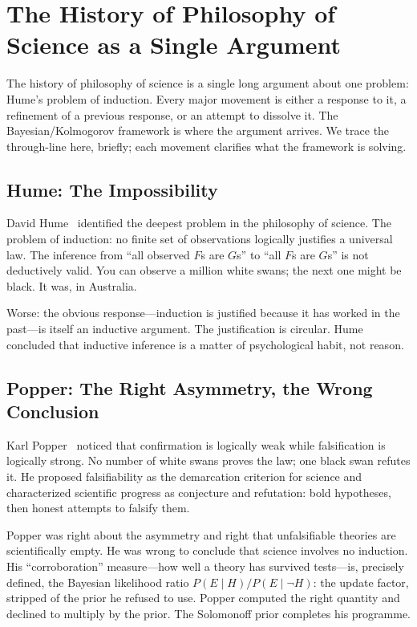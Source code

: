 \section{The History of Philosophy of Science as a Single Argument}
\label{sec:history}

The history of philosophy of science is a single long argument about one problem: Hume's problem of induction. Every major movement is either a response to it, a refinement of a previous response, or an attempt to dissolve it. The Bayesian/Kolmogorov framework is where the argument arrives. We trace the through-line here, briefly; each movement clarifies what the framework is solving.

\subsection{Hume: The Impossibility}

David Hume~\cite{hume1748} identified the deepest problem in the philosophy of science. The problem of induction: no finite set of observations logically justifies a universal law. The inference from ``all observed $F$s are $G$s'' to ``all $F$s are $G$s'' is not deductively valid. You can observe a million white swans; the next one might be black. It was, in Australia.

Worse: the obvious response---induction is justified because it has worked in the past---is itself an inductive argument. The justification is circular. Hume concluded that inductive inference is a matter of psychological habit, not reason.

\subsection{Popper: The Right Asymmetry, the Wrong Conclusion}

Karl Popper~\cite{popper1934} noticed that confirmation is logically weak while falsification is logically strong. No number of white swans proves the law; one black swan refutes it. He proposed falsifiability as the demarcation criterion for science and characterized scientific progress as conjecture and refutation: bold hypotheses, then honest attempts to falsify them.

Popper was right about the asymmetry and right that unfalsifiable theories are scientifically empty. He was wrong to conclude that science involves no induction. His ``corroboration'' measure---how well a theory has survived tests---is, precisely defined, the Bayesian likelihood ratio $P(E \mid H) / P(E \mid \neg H)$: the update factor, stripped of the prior he refused to use. Popper computed the right quantity and declined to multiply by the prior. The Solomonoff prior completes his programme.


